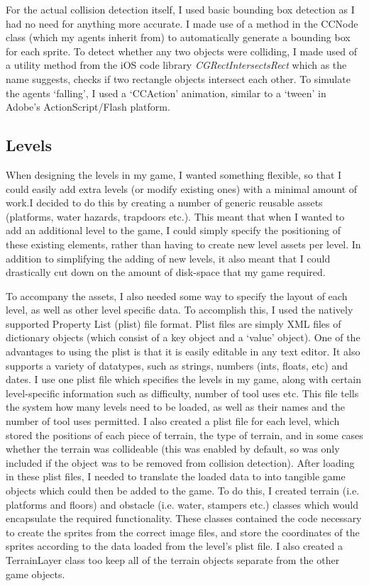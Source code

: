 \documentclass[a4paper,oneside]{report}
\begin{document}
For the actual collision detection itself, I used basic bounding box detection as I had no need for anything more accurate. I made use of a method in the CCNode class (which my agents inherit from) to automatically generate a bounding box for each sprite. To detect whether any two objects were colliding, I made used of a utility method from the iOS code library \emph{CGRectIntersectsRect} which as the name suggests, checks if two rectangle objects intersect each other. To simulate the agents `falling', I used a `CCAction' animation, similar to a `tween' in Adobe's ActionScript/Flash platform. 

\subsection{Levels} 

When designing the levels in my game, I wanted something flexible, so that I could easily add extra levels (or modify existing ones) with a minimal amount of work.I decided to do this by creating a number of generic reusable assets (platforms, water hazards, trapdoors etc.). This meant that when I wanted to add an additional level to the game, I could simply specify the positioning of these existing elements, rather than having to create new level assets per level. In addition to simplifying the adding of new levels, it also meant that I could drastically cut down on the amount of disk-space that my game required.

To accompany the assets, I also needed some way to specify the layout of each level, as well as other level specific data. To accomplish this, I used the natively supported Property List (plist) file format. Plist files are simply XML files of dictionary objects (which consist of a key object and a `value' object). One of the advantages to using the plist is that it is easily editable in any text editor. It also supports a variety of datatypes, such as strings, numbers (ints, floats, etc) and dates. I use one plist file which specifies the levels in my game, along with certain level-specific information such as difficulty, number of tool uses etc. This file tells the system how many levels need to be loaded, as well as their names and the number of tool uses permitted. I also created a plist file for each level, which stored the positions of each piece of terrain, the type of terrain, and in some cases whether the terrain was collideable (this was enabled by default, so was only included if the object was to be removed from collision detection). After loading in these plist files, I needed to translate the loaded data to into tangible game objects which could then be added to the game. To do this, I created terrain (i.e. platforms and floors) and obstacle (i.e. water, stampers etc.) classes which would encapsulate the required functionality. These classes contained the code necessary to create the sprites from the correct image files, and store the coordinates of the sprites according to the data loaded from the level's plist file. I also created a TerrainLayer class too keep all of the terrain objects separate from the other game objects.
\end{document}
